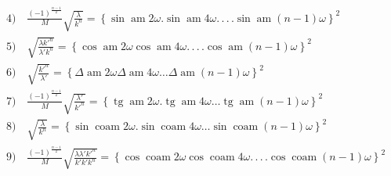 \documentclass{article}
\begin{document}
\[
\begin{gathered}
\text{4)}\quad\frac{(-1)^{\frac{n-1}{2}}}{M}\sqrt{\frac{\lambda}{k^{n}}}=\left\{\sin\operatorname{am}2\omega.\sin\operatorname{am}4\omega.\,.\,.\,.\sin\operatorname{am}(n-1)\omega\right\}^{2}\\[1.5ex]
\text{5)}\quad\sqrt{\frac{\lambda k'^{n}}{\lambda'k^{n}}}=\left\{\cos\operatorname{am}2\omega\cos\operatorname{am}4\omega.\,.\,.\,.\cos\operatorname{am}(n-1)\omega\right\}^{2}\\[1.5ex]
\text{6)}\quad\sqrt{\frac{k'^{n}}{\lambda'}}=\left\{\Delta\operatorname{am}2\omega\Delta\operatorname{am}4\omega\ldots\Delta\operatorname{am}(n-1)\omega\right\}^{2}\\[1.5ex]
\text{7)}\quad\frac{(-1)^{\frac{n-1}{2}}}{M}\sqrt{\frac{\lambda'}{k'^{n}}}=\left\{\operatorname{tg}\operatorname{am}2\omega.\operatorname{tg}\operatorname{am}4\omega\ldots\operatorname{tg}\operatorname{am}(n-1)\omega\right\}^{2}\\[1.5ex]
\text{8)}\quad\sqrt{\frac{\lambda}{k^{n}}}=\left\{\sin\operatorname{coam}2\omega.\sin\operatorname{coam}4\omega\ldots\sin\operatorname{coam}(n-1)\omega\right\}^{2}\\[1.5ex]
\text{9)}\quad\frac{(-1)^{\frac{n-1}{2}}}{M}\sqrt{\frac{\lambda\lambda'k'^{n}}{k'k'k^{n}}}=\left\{\cos\operatorname{coam}2\omega\cos\operatorname{coam}4\omega.\,.\,.\,.\cos\operatorname{coam}(n-1)\omega\right\}^{2}
\end{gathered}
\]
\end{document}
